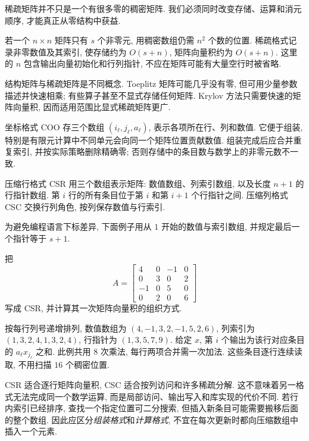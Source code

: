 \label{ch:sparse}
稀疏矩阵并不只是一个有很多零的稠密矩阵. 我们必须同时改变存储、运算和消元顺序, 才能真正从零结构中获益.

若一个 $n\times n$ 矩阵只有 $s$ 个非零元, 用稠密数组仍需 $n^2$ 个数的位置. 稀疏格式记录非零数值及其索引, 使存储约为 $O(s+n)$, 矩阵向量积约为 $O(s+n)$. 这里的 $n$ 包含输出向量初始化和行列指针, 不应在矩阵可能有大量空行时被省略.

结构矩阵与稀疏矩阵是不同概念. Toeplitz 矩阵可能几乎没有零, 但可用少量参数描述并快速相乘; 有些算子甚至不显式存储任何矩阵. Krylov 方法只需要快速的矩阵向量积, 因而适用范围比显式稀疏矩阵更广.

坐标格式 COO 存三个数组 $(i_\ell,j_\ell,a_\ell)$, 表示各项所在行、列和数值. 它便于组装, 特别是有限元计算中不同单元会向同一个矩阵位置贡献数值. 组装完成后应合并重复索引, 并按实际策略删除精确零; 否则存储中的条目数与数学上的非零元数不一致.

\begin{definition}
压缩行格式 CSR 用三个数组表示矩阵: 数值数组、列索引数组, 以及长度 $n+1$ 的行指针数组. 第 $i$ 行的所有条目位于第 $i$ 和第 $i+1$ 个行指针之间. 压缩列格式 CSC 交换行列角色, 按列保存数值与行索引.
\end{definition}
为避免编程语言下标差异, 下面例子用从 $1$ 开始的数值与索引数组, 并规定最后一个指针等于 $s+1$.

\begin{example}
把
\[
A=\begin{bmatrix}
4&0&-1&0\\
0&3&0&2\\
-1&0&5&0\\
0&2&0&6
\end{bmatrix}
\]
写成 CSR, 并计算其一次矩阵向量积的组织方式.
\end{example}
\begin{solution}
按每行列号递增排列, 数值数组为 $(4,-1,3,2,-1,5,2,6)$, 列索引为 $(1,3,2,4,1,3,2,4)$, 行指针为 $(1,3,5,7,9)$. 给定 $x$, 第 $i$ 个输出为该行对应条目的 $a_\ell x_{j_\ell}$ 之和. 此例共用 $8$ 次乘法, 每行两项合并需一次加法. 这些条目逐行连续读取, 不用扫描 $16$ 个稠密位置.
\end{solution}
CSR 适合逐行矩阵向量积, CSC 适合按列访问和许多稀疏分解. 这不意味着另一格式无法完成同一个数学运算, 而是局部访问、输出写入和库实现的代价不同. 若行内索引已经排序, 查找一个指定位置可二分搜索, 但插入新条目可能需要搬移后面的整个数组. 因此应区分\emph{组装格式}和\emph{计算格式}, 不宜在每次更新时都向压缩数组中插入一个元素.

